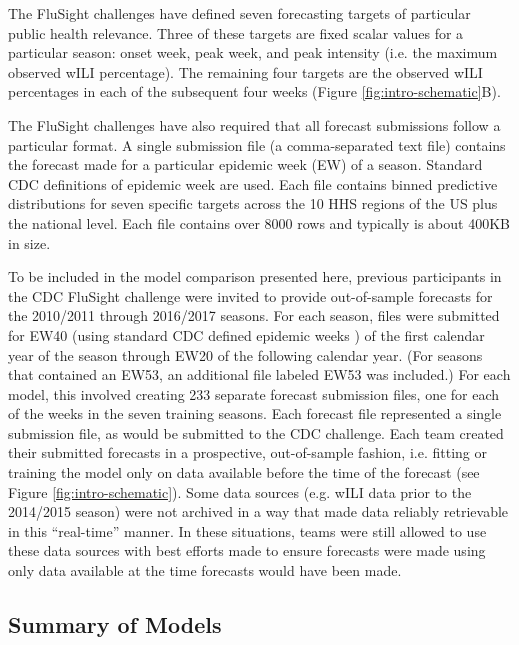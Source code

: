 \documentclass{article}\usepackage[]{graphicx}\usepackage[]{color}
\begin{document}
The FluSight challenges have defined seven forecasting targets of particular public health relevance. Three of these targets are fixed scalar values for a particular season: onset week, peak week, and peak intensity (i.e. the maximum observed wILI percentage). The remaining four targets are the observed wILI percentages in each of the subsequent four weeks (Figure \ref{fig:intro-schematic}B). 

The FluSight challenges have also required that all forecast submissions follow a particular format. A single submission file (a comma-separated text file) contains the forecast made for a particular epidemic week (EW) of a season. Standard CDC definitions of epidemic week are used. Each file contains binned predictive distributions for seven specific targets across the 10 HHS regions of the US plus the national level. Each file contains over 8000 rows and typically is about 400KB in size.

To be included in the model comparison presented here, previous participants in the CDC FluSight challenge were invited to provide out-of-sample forecasts for the 2010/2011 through 2016/2017 seasons.
For each season, files were submitted for EW40 (using standard CDC defined epidemic weeks \cite{NewMexicoDepartmentofHealth,Niemi2015,Tushar2018}) of the first calendar year of the season through EW20 of the following calendar year. 
(For seasons that contained an EW53, an additional file labeled EW53 was included.)
For each model, this involved creating 233 separate forecast submission files, one for each of the weeks in the seven training seasons.
Each forecast file represented a single submission file, as would be submitted to the CDC challenge. 
Each team created their submitted forecasts in a prospective, out-of-sample fashion, i.e. fitting or training the model only on data available before the time of the forecast (see Figure \ref{fig:intro-schematic}). 
Some data sources (e.g. wILI data prior to the 2014/2015 season) were not archived in a way that made data reliably retrievable in this ``real-time'' manner. In these situations, teams were still allowed to use these data sources with best efforts made to ensure forecasts were made using only data available at the time forecasts would have been made.

\subsection{Summary of Models}
\end{document}

